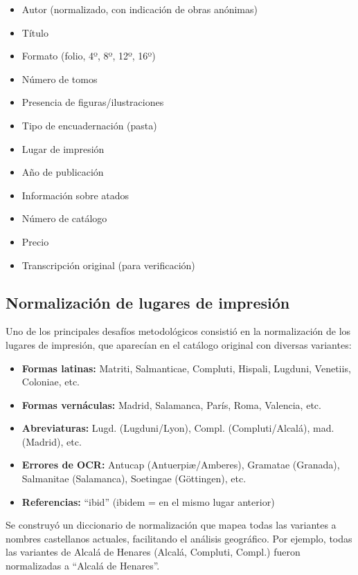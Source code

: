 \documentclass[12pt,a4paper]{article}
\begin{document}
\begin{itemize}
    \item Autor (normalizado, con indicación de obras anónimas)
    \item Título
    \item Formato (folio, 4º, 8º, 12º, 16º)
    \item Número de tomos
    \item Presencia de figuras/ilustraciones
    \item Tipo de encuadernación (pasta)
    \item Lugar de impresión
    \item Año de publicación
    \item Información sobre atados
    \item Número de catálogo
    \item Precio
    \item Transcripción original (para verificación)
\end{itemize}

\subsection{Normalización de lugares de impresión}

Uno de los principales desafíos metodológicos consistió en la normalización de los lugares de impresión, que aparecían en el catálogo original con diversas variantes:

\begin{itemize}
    \item \textbf{Formas latinas:} Matriti, Salmanticae, Compluti, Hispali, Lugduni, Venetiis, Coloniae, etc.
    \item \textbf{Formas vernáculas:} Madrid, Salamanca, París, Roma, Valencia, etc.
    \item \textbf{Abreviaturas:} Lugd. (Lugduni/Lyon), Compl. (Compluti/Alcalá), mad. (Madrid), etc.
    \item \textbf{Errores de OCR:} Antucap (Antuerpiæ/Amberes), Gramatae (Granada), Salmanitae (Salamanca), Soetingae (Göttingen), etc.
    \item \textbf{Referencias:} ``ibid'' (ibidem = en el mismo lugar anterior)
\end{itemize}

Se construyó un diccionario de normalización que mapea todas las variantes a nombres castellanos actuales, facilitando el análisis geográfico. Por ejemplo, todas las variantes de Alcalá de Henares (Alcalá, Compluti, Compl.) fueron normalizadas a ``Alcalá de Henares''.
\end{document}
